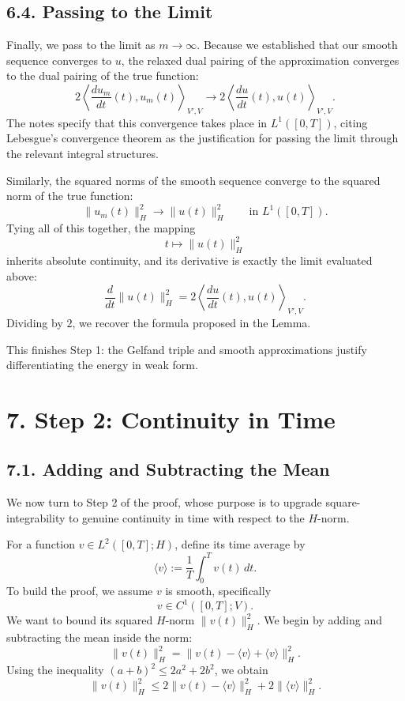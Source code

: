 \documentclass[11pt]{article}
\theoremstyle{definition}
\theoremstyle{remark}
\begin{document}
\subsection*{6.4. Passing to the Limit}
Finally, we pass to the limit as \(m\to\infty\). Because we established that our smooth sequence converges to \(u\), the relaxed dual pairing of the approximation converges to the dual pairing of the true function:
\[
2\left\langle \frac{du_m}{dt}(t),u_m(t)\right\rangle_{V',V}
\to
2\left\langle \frac{du}{dt}(t),u(t)\right\rangle_{V',V}.
\]
The notes specify that this convergence takes place in \(L^1([0,T])\), citing Lebesgue's convergence theorem as the justification for passing the limit through the relevant integral structures.

Similarly, the squared norms of the smooth sequence converge to the squared norm of the true function:
\[
\|u_m(t)\|_H^2\to \|u(t)\|_H^2
\qquad \text{in } L^1([0,T]).
\]
Tying all of this together, the mapping
\[
t\mapsto \|u(t)\|_H^2
\]
inherits absolute continuity, and its derivative is exactly the limit evaluated above:
\[
\frac{d}{dt}\|u(t)\|_H^2
=
2\left\langle \frac{du}{dt}(t),u(t)\right\rangle_{V',V}.
\]
Dividing by \(2\), we recover the formula proposed in the Lemma.

This finishes Step 1: the Gelfand triple and smooth approximations justify differentiating the energy in weak form.

\section*{7. Step 2: Continuity in Time}

\subsection*{7.1. Adding and Subtracting the Mean}
We now turn to Step 2 of the proof, whose purpose is to upgrade square-integrability to genuine continuity in time with respect to the \(H\)-norm.

For a function \(v\in L^2([0,T];H)\), define its time average by
\[
\langle v\rangle:=\frac{1}{T}\int_0^T v(t)\,dt.
\]
To build the proof, we assume \(v\) is smooth, specifically
\[
v\in C^1([0,T];V).
\]
We want to bound its squared \(H\)-norm \(\|v(t)\|_H^2\). We begin by adding and subtracting the mean inside the norm:
\[
\|v(t)\|_H^2=\|v(t)-\langle v\rangle+\langle v\rangle\|_H^2.
\]
Using the inequality \((a+b)^2\le 2a^2+2b^2\), we obtain
\[
\|v(t)\|_H^2
\le
2\|v(t)-\langle v\rangle\|_H^2+2\|\langle v\rangle\|_H^2.
\]
\end{document}
